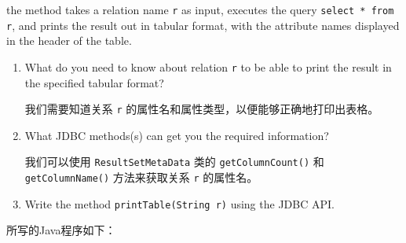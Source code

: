\documentclass{article}
\renewcommand\tt{\texttt}
\begin{document}
the method takes a relation name \tt{r} as input, executes the query \tt{select * from r}, and
prints the result out in tabular format, with the attribute names displayed in the header of the table.

\begin{enumerate}[label=(\alph*)]
  \item What do you need to know about relation \tt{r} to be able to print the result in the specified tabular format?
  
  我们需要知道关系 \tt{r} 的属性名和属性类型，以便能够正确地打印出表格。
  \item What JDBC methods(s) can get you the required information?
  
  我们可以使用 \tt{ResultSetMetaData} 类的 \tt{getColumnCount()} 和 \tt{getColumnName()} 方法来获取关系 \tt{r} 的属性名。
  \item Write the method \tt{printTable(String r)} using the JDBC API.
\end{enumerate}

所写的Java程序如下：
\end{document}
